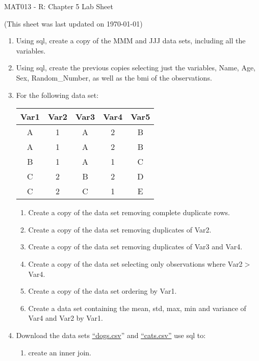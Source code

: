 \documentclass[12pt]{article}
\begin{document}
\begin{center}
\huge{MAT013 - R: Chapter 5 Lab Sheet}\\
\begin{center}
\tiny{(This sheet was last updated on \today)}
\end{center}
\end{center}

\begin{enumerate}
\item Using sql, create a copy of the MMM and JJJ data sets, including all the variables.
\item Using sql, create the previous copies selecting just the variables, Name, Age, Sex, Random\_Number, as well as the bmi of the observations.
\item For the following data set:
\begin{center}
\begin{tabular}{|c|c|c|c|c|}
\hline
Var1&Var2&Var3&Var4&Var5\\\hline\hline
A&1&A&2&B\\\hline
A&1&A&2&B\\\hline
B&1&A&1&C\\\hline
C&2&B&2&D\\\hline
C&2&C&1&E\\\hline
\end{tabular}
\end{center}
\begin{enumerate}
\item Create a copy of the data set removing complete duplicate rows.
\item Create a copy of the data set removing duplicates of Var2.
\item Create a copy of the data set removing duplicates of Var3 and Var4.
\item Create a copy of the data set selecting only observations where Var2$>$Var4.
\item Create a copy of the data set ordering by Var1.
\item Create a data set containing the mean, std, max, min and variance of Var4 and Var2 by Var1.
\end{enumerate}
\item Download the data sets \href{https://docs.google.com/file/d/0Bx_zrw5uAafbekVHY0tLMlJydzA/edit}{ ``dogs.csv}'' and \href{https://docs.google.com/file/d/0Bx_zrw5uAafbVzNLeVNDSXNiSkU/edit}{``cats.csv''} use sql to:
\begin{enumerate}
\item create an inner join.

\end{enumerate}
\end{enumerate}
\end{document}
